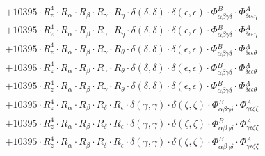 \documentclass{article}
\begin{document}
\begin{subequations}
\begin{gather}
\begin{array}{c}
 \\[0.2em] 		 + 10395 \cdot R_{z}^{4} \cdot R_{\alpha{}} \cdot R_{\beta{}} \cdot R_{\gamma{}} \cdot R_{\eta{}} \cdot \delta{}\left(\delta{}, \delta{}\right) \cdot \delta{}\left(\epsilon{}, \epsilon{}\right) \cdot \Phi{}^{B}_{\alpha{}\beta{}\gamma{}\delta{}} \cdot \Phi{}^{A}_{\delta{}\epsilon{}\epsilon{}\eta{}} 
 \\[0.2em] 		 + 10395 \cdot R_{z}^{4} \cdot R_{\alpha{}} \cdot R_{\beta{}} \cdot R_{\gamma{}} \cdot R_{\eta{}} \cdot \delta{}\left(\delta{}, \delta{}\right) \cdot \delta{}\left(\epsilon{}, \epsilon{}\right) \cdot \Phi{}^{B}_{\alpha{}\beta{}\gamma{}\delta{}} \cdot \Phi{}^{A}_{\delta{}\epsilon{}\epsilon{}\eta{}} 
 \\[0.2em] 		 + 10395 \cdot R_{z}^{4} \cdot R_{\alpha{}} \cdot R_{\beta{}} \cdot R_{\gamma{}} \cdot R_{\theta{}} \cdot \delta{}\left(\delta{}, \delta{}\right) \cdot \delta{}\left(\epsilon{}, \epsilon{}\right) \cdot \Phi{}^{B}_{\alpha{}\beta{}\gamma{}\delta{}} \cdot \Phi{}^{A}_{\delta{}\epsilon{}\epsilon{}\theta{}} 
 \\[0.2em] 		 + 10395 \cdot R_{z}^{4} \cdot R_{\alpha{}} \cdot R_{\beta{}} \cdot R_{\gamma{}} \cdot R_{\theta{}} \cdot \delta{}\left(\delta{}, \delta{}\right) \cdot \delta{}\left(\epsilon{}, \epsilon{}\right) \cdot \Phi{}^{B}_{\alpha{}\beta{}\gamma{}\delta{}} \cdot \Phi{}^{A}_{\delta{}\epsilon{}\epsilon{}\theta{}} 
 \\[0.2em] 		 + 10395 \cdot R_{z}^{4} \cdot R_{\alpha{}} \cdot R_{\beta{}} \cdot R_{\gamma{}} \cdot R_{\theta{}} \cdot \delta{}\left(\delta{}, \delta{}\right) \cdot \delta{}\left(\epsilon{}, \epsilon{}\right) \cdot \Phi{}^{B}_{\alpha{}\beta{}\gamma{}\delta{}} \cdot \Phi{}^{A}_{\delta{}\epsilon{}\epsilon{}\theta{}} 
 \\[0.2em] 		 + 10395 \cdot R_{z}^{4} \cdot R_{\alpha{}} \cdot R_{\beta{}} \cdot R_{\delta{}} \cdot R_{\epsilon{}} \cdot \delta{}\left(\gamma{}, \gamma{}\right) \cdot \delta{}\left(\zeta{}, \zeta{}\right) \cdot \Phi{}^{B}_{\alpha{}\beta{}\gamma{}\delta{}} \cdot \Phi{}^{A}_{\gamma{}\epsilon{}\zeta{}\zeta{}} 
 \\[0.2em] 		 + 10395 \cdot R_{z}^{4} \cdot R_{\alpha{}} \cdot R_{\beta{}} \cdot R_{\delta{}} \cdot R_{\epsilon{}} \cdot \delta{}\left(\gamma{}, \gamma{}\right) \cdot \delta{}\left(\zeta{}, \zeta{}\right) \cdot \Phi{}^{B}_{\alpha{}\beta{}\gamma{}\delta{}} \cdot \Phi{}^{A}_{\gamma{}\epsilon{}\zeta{}\zeta{}} 
 \\[0.2em] 		 + 10395 \cdot R_{z}^{4} \cdot R_{\alpha{}} \cdot R_{\beta{}} \cdot R_{\delta{}} \cdot R_{\epsilon{}} \cdot \delta{}\left(\gamma{}, \gamma{}\right) \cdot \delta{}\left(\zeta{}, \zeta{}\right) \cdot \Phi{}^{B}_{\alpha{}\beta{}\gamma{}\delta{}} \cdot \Phi{}^{A}_{\gamma{}\epsilon{}\zeta{}\zeta{}} 

\end{array}
\end{gather}
\end{subequations}
\end{document}
